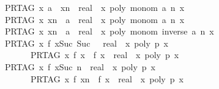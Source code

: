 \begin{isabellebody}
\ \ {\isachardoublequoteopen}PR{\isacharunderscore}TAG\ {\isacharparenleft}{\isasymlambda}x{\isachardot}\ a\ {\isacharasterisk}\ x{\isacharcircum}n\ {\isacharcolon}{\isacharcolon}\ real{\isacharparenright}\ {\isacharequal}\ {\isacharparenleft}{\isasymlambda}x{\isachardot}\ poly\ {\isacharparenleft}monom\ a\ n{\isacharparenright}\ x{\isacharparenright}{\isachardoublequoteclose}\isanewline
\ \ {\isachardoublequoteopen}PR{\isacharunderscore}TAG\ {\isacharparenleft}{\isasymlambda}x{\isachardot}\ x{\isacharcircum}n\ {\isacharasterisk}\ a\ {\isacharcolon}{\isacharcolon}\ real{\isacharparenright}\ {\isacharequal}\ {\isacharparenleft}{\isasymlambda}x{\isachardot}\ poly\ {\isacharparenleft}monom\ a\ n{\isacharparenright}\ x{\isacharparenright}{\isachardoublequoteclose}\isanewline
\ \ {\isachardoublequoteopen}PR{\isacharunderscore}TAG\ {\isacharparenleft}{\isasymlambda}x{\isachardot}\ x{\isacharcircum}n\ {\isacharslash}\ a\ {\isacharcolon}{\isacharcolon}\ real{\isacharparenright}\ {\isacharequal}\ {\isacharparenleft}{\isasymlambda}x{\isachardot}\ poly\ {\isacharparenleft}monom\ {\isacharparenleft}inverse\ a{\isacharparenright}\ n{\isacharparenright}\ x{\isacharparenright}{\isachardoublequoteclose}\isanewline
\ \ {\isachardoublequoteopen}PR{\isacharunderscore}TAG\ {\isacharparenleft}{\isasymlambda}x{\isachardot}\ f\ x{\isacharcircum}{\isacharparenleft}Suc\ {\isacharparenleft}Suc\ {}{\isacharparenright}{\isacharparenright}\ {\isacharcolon}{\isacharcolon}\ real{\isacharparenright}\ {\isacharequal}\ {\isacharparenleft}{\isasymlambda}x{\isachardot}\ poly\ p\ x{\isacharparenright}\isanewline
\ \ \ \ \ \ \ {\isasymLongrightarrow}\ PR{\isacharunderscore}TAG\ {\isacharparenleft}{\isasymlambda}x{\isachardot}\ f\ x\ {\isacharasterisk}\ f\ x\ {\isacharcolon}{\isacharcolon}\ real{\isacharparenright}\ {\isacharequal}\ {\isacharparenleft}{\isasymlambda}x{\isachardot}\ poly\ p\ x{\isacharparenright}{\isachardoublequoteclose}\isanewline
\ \ {\isachardoublequoteopen}PR{\isacharunderscore}TAG\ {\isacharparenleft}{\isasymlambda}x{\isachardot}\ {\isacharparenleft}f\ x{\isacharparenright}{\isacharcircum}Suc\ n\ {\isacharcolon}{\isacharcolon}\ real{\isacharparenright}\ {\isacharequal}\ {\isacharparenleft}{\isasymlambda}x{\isachardot}\ poly\ p\ x{\isacharparenright}\isanewline
\ \ \ \ \ \ \ {\isasymLongrightarrow}\ PR{\isacharunderscore}TAG\ {\isacharparenleft}{\isasymlambda}x{\isachardot}\ {\isacharparenleft}f\ x{\isacharparenright}{\isacharcircum}n\ {\isacharasterisk}\ f\ x\ {\isacharcolon}{\isacharcolon}\ real{\isacharparenright}\ {\isacharequal}\ {\isacharparenleft}{\isasymlambda}x{\isachardot}\ poly\ p\ x{\isacharparenright}{\isachardoublequoteclose}\isanewline

\end{isabellebody}

